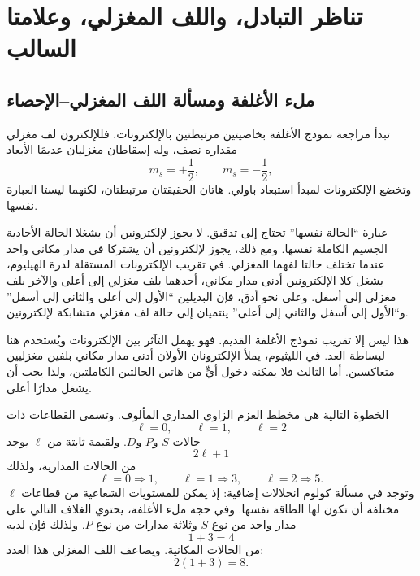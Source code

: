 \chapter{تناظر التبادل، واللف المغزلي، وعلامتا السالب}

\section{ملء الأغلفة ومسألة اللف المغزلي--الإحصاء}

تبدأ مراجعة نموذج الأغلفة بخاصيتين مرتبطتين بالإلكترونات. فللإلكترون لف مغزلي مقداره نصف، وله إسقاطان مغزليان عديمَا الأبعاد
\begin{equation}
m_s=+\frac12,
\qquad
m_s=-\frac12,
\end{equation}
وتخضع الإلكترونات لمبدأ استبعاد باولي. هاتان الحقيقتان مرتبطتان، لكنهما ليستا العبارة نفسها.

عبارة ``الحالة نفسها'' تحتاج إلى تدقيق. لا يجوز لإلكترونين أن يشغلا الحالة الأحادية الجسيم الكاملة نفسها. ومع ذلك، يجوز لإلكترونين أن يشتركا في مدار مكاني واحد عندما تختلف حالتا لفهما المغزلي. في تقريب الإلكترونات المستقلة لذرة الهيليوم، يشغل كلا الإلكترونين أدنى مدار مكاني، أحدهما بلف مغزلي إلى أعلى والآخر بلف مغزلي إلى أسفل. وعلى نحو أدق، فإن البديلين ``الأول إلى أعلى والثاني إلى أسفل'' و``الأول إلى أسفل والثاني إلى أعلى'' ينتميان إلى حالة لف مغزلي متشابكة لإلكترونين.

هذا ليس إلا تقريب نموذج الأغلفة القديم. فهو يهمل التآثر بين الإلكترونات ويُستخدم هنا لبساطة العد. في الليثيوم، يملأ الإلكترونان الأولان أدنى مدار مكاني بلفين مغزليين متعاكسين. أما الثالث فلا يمكنه دخول أيٍّ من هاتين الحالتين الكاملتين، ولذا يجب أن يشغل مدارًا أعلى.

الخطوة التالية هي مخطط العزم الزاوي المداري المألوف. وتسمى القطاعات ذات
\begin{equation}
\ell=0,\qquad \ell=1,\qquad \ell=2
\end{equation}
حالات \(S\) و\(P\) و\(D\). ولقيمة ثابتة من \(\ell\) يوجد
\begin{equation}
2\ell+1
\end{equation}
من الحالات المدارية، ولذلك
\begin{equation}
\ell=0\Rightarrow 1,
\qquad
\ell=1\Rightarrow 3,
\qquad
\ell=2\Rightarrow 5.
\end{equation}
وتوجد في مسألة كولوم انحلالات إضافية: إذ يمكن للمستويات الشعاعية من قطاعات \(\ell\) مختلفة أن تكون لها الطاقة نفسها. وفي حجة ملء الأغلفة، يحتوي الغلاف التالي على مدار واحد من نوع \(S\) وثلاثة مدارات من نوع \(P\). ولذلك فإن لديه
\begin{equation}
1+3=4
\end{equation}
من الحالات المكانية. ويضاعف اللف المغزلي هذا العدد:
\begin{equation}
2(1+3)=8.
\end{equation}

